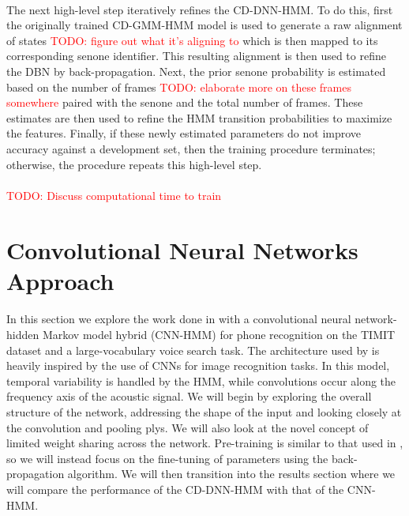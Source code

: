 \documentclass[letterpaper]{article}
\newcommand{\TODO}[1]{\textcolor{red}{TODO: #1}}
\begin{document}
\paragraph{} The next high-level step iteratively refines the CD-DNN-HMM. To do this, first the originally trained CD-GMM-HMM model is used to generate a raw alignment of states \TODO{figure out what it's aligning to} which is then mapped to its corresponding senone identifier. This resulting alignment is then used to refine the DBN by back-propagation. Next, the prior senone probability is estimated based on the number of frames \TODO{elaborate more on these frames somewhere} paired with the senone and the total number of frames. These estimates are then used to refine the HMM transition probabilities to maximize the features. Finally, if these newly estimated parameters do not improve accuracy against a development set, then the training procedure terminates; otherwise, the procedure repeats this high-level step.

\paragraph{} \TODO{Discuss computational time to train}

\section*{Convolutional Neural Networks Approach}

\paragraph{} In this section we explore the work done in \cite{DBLP:journals/taslp/Abdel-HamidMJDPY14} with a convolutional neural network-hidden Markov model hybrid (CNN-HMM) for phone recognition on the TIMIT dataset and a large-vocabulary voice search task. The architecture used by \cite{DBLP:journals/taslp/Abdel-HamidMJDPY14} is heavily inspired by the use of CNNs for image recognition tasks. In this model, temporal variability is handled by the HMM, while convolutions occur along the frequency axis of the acoustic signal. We will begin by exploring the overall structure of the network, addressing the shape of the input and looking closely at the convolution and pooling plys. We will also look at the novel concept of limited weight sharing across the network. Pre-training is similar to that used in \cite{DBLP:journals/taslp/DahlYDA12}, so we will instead focus on the fine-tuning of parameters using the back-propagation algorithm. We will then transition into the results section where we will compare the performance of the CD-DNN-HMM with that of the CNN-HMM.
\end{document}

